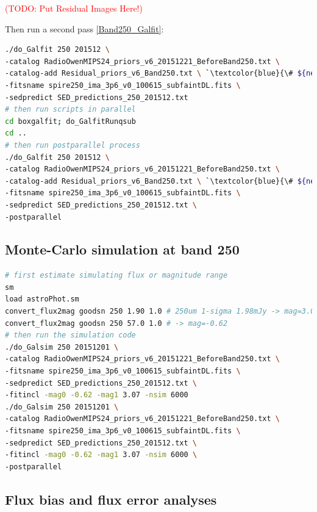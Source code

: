 \documentclass[11pt,a4paper]{article}
\begin{document}
\textcolor{red}{(TODO: Put Residual Images Here!)}

Then run a second pass \ref{Band250_Galfit}: 

\begin{lstlisting}[language=bash]
./do_Galfit 250 201512 \
-catalog RadioOwenMIPS24_priors_v6_20151221_BeforeBand250.txt \
-catalog-add Residual_priors_v6_Band250.txt \ `\textcolor{blue}{\# ${new!}$}`
-fitsname spire250_ima_3p6_v0_100615_subfaintDL.fits \
-sedpredict SED_predictions_250_201512.txt
# then run scripts in parallel 
cd boxgalfit; do_GalfitRunqsub
cd ..
# then run postparallel process
./do_Galfit 250 201512 \
-catalog RadioOwenMIPS24_priors_v6_20151221_BeforeBand250.txt \
-catalog-add Residual_priors_v6_Band250.txt \ `\textcolor{blue}{\# ${new!}$}`
-fitsname spire250_ima_3p6_v0_100615_subfaintDL.fits \
-sedpredict SED_predictions_250_201512.txt \
-postparallel
\end{lstlisting}

\subsection{Monte-Carlo simulation at band 250}
\label{Band250_Galsim}

\begin{lstlisting}[language=bash]
# first estimate simulating flux or magnitude range
sm
load astroPhot.sm 
convert_flux2mag goodsn 250 1.90 1.0 # 250um 1-sigma 1.98mJy -> mag=3.069
convert_flux2mag goodsn 250 57.0 1.0 # -> mag=-0.62
# then run the simulation code
./do_Galsim 250 20151201 \
-catalog RadioOwenMIPS24_priors_v6_20151221_BeforeBand250.txt \
-fitsname spire250_ima_3p6_v0_100615_subfaintDL.fits \
-sedpredict SED_predictions_250_201512.txt \
-fitincl -mag0 -0.62 -mag1 3.07 -nsim 6000 
./do_Galsim 250 20151201 \
-catalog RadioOwenMIPS24_priors_v6_20151221_BeforeBand250.txt \
-fitsname spire250_ima_3p6_v0_100615_subfaintDL.fits \
-sedpredict SED_predictions_250_201512.txt \
-fitincl -mag0 -0.62 -mag1 3.07 -nsim 6000 \
-postparallel
\end{lstlisting}


\subsection{Flux bias and flux error analyses}
\label{Band250_simanalyses}
\end{document}
